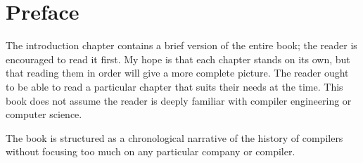 \chapter{Preface}

The introduction chapter contains a brief version of the entire book; the reader is encouraged to read it first.
My hope is that each chapter stands on its own, but that reading them in order will give a more complete picture.
The reader ought to be able to read a particular chapter that suits their needs at the time.
This book does not assume the reader is deeply familiar with compiler engineering or computer science.

The book is structured as a chronological narrative of the history of compilers
without focusing too much on any particular company or compiler.
